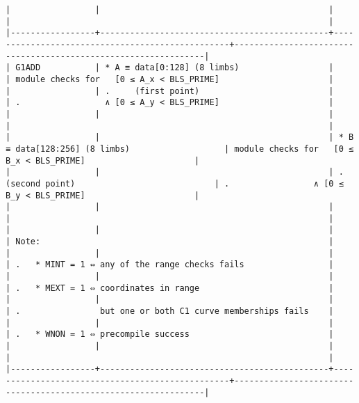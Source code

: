 \documentclass[varwidth=\maxdimen,margin=0.5cm,multi={verbatim}]{standalone}
\begin{document}
\begin{verbatim}
|                 |                                              |                                                 |                                                                |
|-----------------+----------------------------------------------+-------------------------------------------------+----------------------------------------------------------------|
| G1ADD           | * A ≡ data[0:128] (8 limbs)                  |                                                 | module checks for   [0 ≤ A_x < BLS_PRIME]                      |
|                 | .     (first point)                          |                                                 | .                 ∧ [0 ≤ A_y < BLS_PRIME]                      |
|                 |                                              |                                                 |                                                                |
|                 |                                              | * B ≡ data[128:256] (8 limbs)                   | module checks for   [0 ≤ B_x < BLS_PRIME]                      |
|                 |                                              | .     (second point)                            | .                 ∧ [0 ≤ B_y < BLS_PRIME]                      |
|                 |                                              |                                                 |                                                                |
|                 |                                              |                                                 | Note:                                                          |
|                 |                                              |                                                 | .   * MINT = 1 ⇔ any of the range checks fails                 |
|                 |                                              |                                                 | .   * MEXT = 1 ⇔ coordinates in range                          |
|                 |                                              |                                                 | .                but one or both C1 curve memberships fails    |
|                 |                                              |                                                 | .   * WNON = 1 ⇔ precompile success                            |
|                 |                                              |                                                 |                                                                |
|-----------------+----------------------------------------------+-------------------------------------------------+----------------------------------------------------------------|

\end{verbatim}
\end{document}
